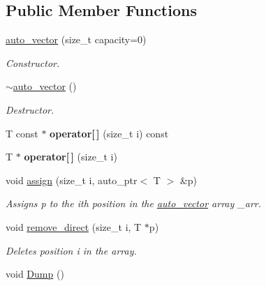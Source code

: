 \subsection*{Public Member Functions}
\begin{DoxyCompactItemize}
\item 
\hyperlink{classauto__vector_ab463df1a0a9c3f3cb6943b33e3ef8e50}{auto\-\_\-vector} (size\-\_\-t capacity=0)
\begin{DoxyCompactList}\small\item\em Constructor. \end{DoxyCompactList}\item 
\hypertarget{classauto__vector_a7858fbbe2f4d94be3df80d48f4862f3c}{\hyperlink{classauto__vector_a7858fbbe2f4d94be3df80d48f4862f3c}{$\sim$auto\-\_\-vector} ()}\label{classauto__vector_a7858fbbe2f4d94be3df80d48f4862f3c}

\begin{DoxyCompactList}\small\item\em Destructor. \end{DoxyCompactList}\item 
\hypertarget{classauto__vector_a3be25f0b235aae9b7f4d11fbd0388eee}{T const $\ast$ {\bfseries operator\mbox{[}$\,$\mbox{]}} (size\-\_\-t i) const }\label{classauto__vector_a3be25f0b235aae9b7f4d11fbd0388eee}

\item 
\hypertarget{classauto__vector_ad8d0dc748236e2a49675918e114c9bf1}{T $\ast$ {\bfseries operator\mbox{[}$\,$\mbox{]}} (size\-\_\-t i)}\label{classauto__vector_ad8d0dc748236e2a49675918e114c9bf1}

\item 
void \hyperlink{classauto__vector_aaa9c829b0a79ba7b04c6d670a0b4560c}{assign} (size\-\_\-t i, auto\-\_\-ptr$<$ T $>$ \&p)
\begin{DoxyCompactList}\small\item\em Assigns {\itshape p} to the {\itshape ith} position in the \hyperlink{classauto__vector}{auto\-\_\-vector} array \-\_\-arr. \end{DoxyCompactList}\item 
void \hyperlink{classauto__vector_ae912e8d33747dd0bd1dac1bd6253739d}{remove\-\_\-direct} (size\-\_\-t i, T $\ast$p)
\begin{DoxyCompactList}\small\item\em Deletes position {\itshape i} in the array. \end{DoxyCompactList}\item 
\hypertarget{classauto__vector_ac84a439202d7e6a8a7455b6bd9007f67}{void \hyperlink{classauto__vector_ac84a439202d7e6a8a7455b6bd9007f67}{Dump} ()}\label{classauto__vector_ac84a439202d7e6a8a7455b6bd9007f67}


\end{DoxyCompactItemize}
